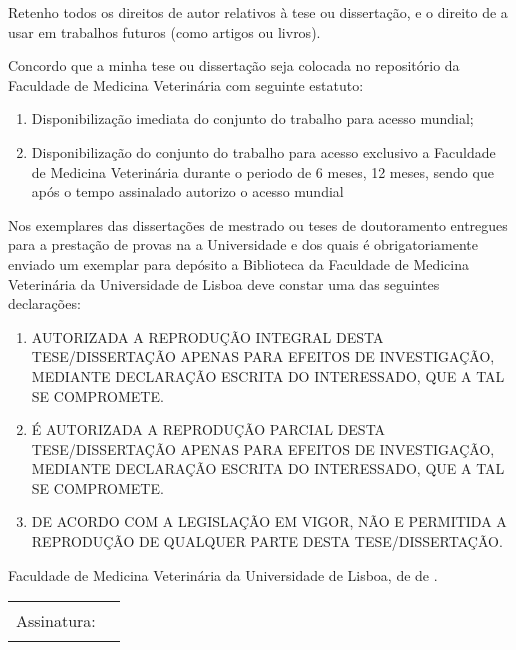 Retenho todos os direitos de autor relativos à tese ou dissertação, e o direito de a usar em trabalhos futuros (como artigos ou livros).

Concordo que a minha tese ou dissertação seja colocada no repositório da Faculdade de Medicina Veterinária com seguinte estatuto:
\begin{enumerate}
  \item {} Disponibilização imediata do conjunto do trabalho para acesso mundial;
  \item {} Disponibilização do conjunto do trabalho para acesso exclusivo a Faculdade de Medicina Veterinária durante o periodo de  6 meses, 
 12 meses, sendo que após o tempo assinalado autorizo o acesso mundial%
\end{enumerate}

{\footnotesize Nos exemplares das dissertações de mestrado ou teses de doutoramento entregues para a prestação de provas na a
Universidade e dos quais é obrigatoriamente enviado um exemplar para depósito a Biblioteca da Faculdade de Medicina
Veterinária da Universidade de Lisboa deve constar uma das seguintes declarações:}
\begin{enumerate}
  \item [\checkbox{reproduction}{I}] 
        AUTORIZADA A REPRODUÇÃO INTEGRAL DESTA TESE/DISSERTAÇÃO APENAS PARA EFEITOS DE INVESTIGAÇÃO, 
        MEDIANTE DECLARAÇÃO ESCRITA DO INTERESSADO, QUE A TAL SE COMPROMETE.
  \item [\checkbox{reproduction}{P}] 
        É AUTORIZADA A REPRODUÇÃO PARCIAL DESTA TESE/DISSERTAÇÃO APENAS PARA EFEITOS DE INVESTIGAÇÃO, 
        MEDIANTE DECLARAÇÃO ESCRITA DO INTERESSADO, QUE A TAL SE COMPROMETE.
  \item [\checkbox{reproduction}{N}] 
        DE ACORDO COM A LEGISLAÇÃO EM VIGOR, NÃO E PERMITIDA A REPRODUÇÃO DE QUALQUER PARTE DESTA 
        TESE/DISSERTAÇÃO.
\end{enumerate}
  
Faculdade de Medicina Veterinária da Universidade de Lisboa, 
 de
 de
.\par
\vspace*{2ex}
\begin{tabularx}{\linewidth}{@{}lX@{}}
Assinatura: & \rule{\linewidth}{0.75pt}
\end{tabularx}
\vfill
\ntprintacknowledgementsblock
\egroup
